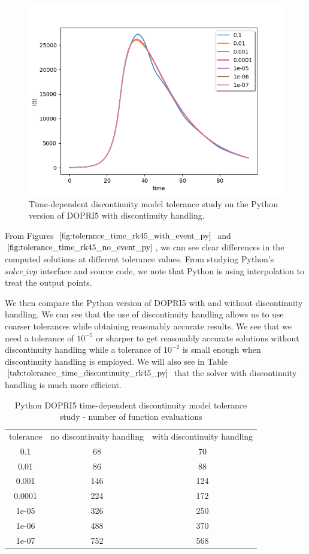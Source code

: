 \begin{figure}[H]
\centering
\includegraphics[width=0.7\linewidth]{./figures/tolerance_time_rk45_with_event_py}
\caption{Time-dependent discontinuity model tolerance study on the Python version of DOPRI5 with discontinuity handling.}
\label{fig:tolerance_time_rk45_with_event_py}
\end{figure}

From Figures $\ref{fig:tolerance_time_rk45_with_event_py}$ and $\ref{fig:tolerance_time_rk45_no_event_py}$, we can see clear differences in the computed solutions at different tolerance values. From studying Python's $solve\_ivp$ interface and source code, we note that Python is using interpolation
to treat the output points.

We then compare the Python version of DOPRI5 with and without discontinuity handling. We can see that the use of discontinuity handling allows us to use coarser tolerances while obtaining reasonably accurate results. We see that we need a tolerance of $10^{-5}$ or sharper to get reasonably accurate solutions without discontinuity handling while a tolerance of $10^{-2}$ is small enough when discontinuity handling is employed. We will also see in Table $\ref{tab:tolerance_time_discontinuity_rk45_py}$ that the solver with discontinuity handling is much more efficient.


\begin{table}[H]
\caption {Python DOPRI5 time-dependent discontinuity model tolerance study - number of function evaluations} \label{tab:tolerance_time_discontinuity_rk45_py} 
\begin{center}
\begin{tabular}{ c c c }
tolerance & no discontinuity handling & with discontinuity handling \\ 
0.1 & 68 & 70 \\
0.01 & 86 & 88 \\
0.001 & 146 & 124 \\
0.0001& 224 & 172 \\
1e-05 & 326 & 250 \\
1e-06 & 488 & 370 \\
1e-07 & 752 & 568 \\
\end{tabular}
\end{center}
\end{table}

